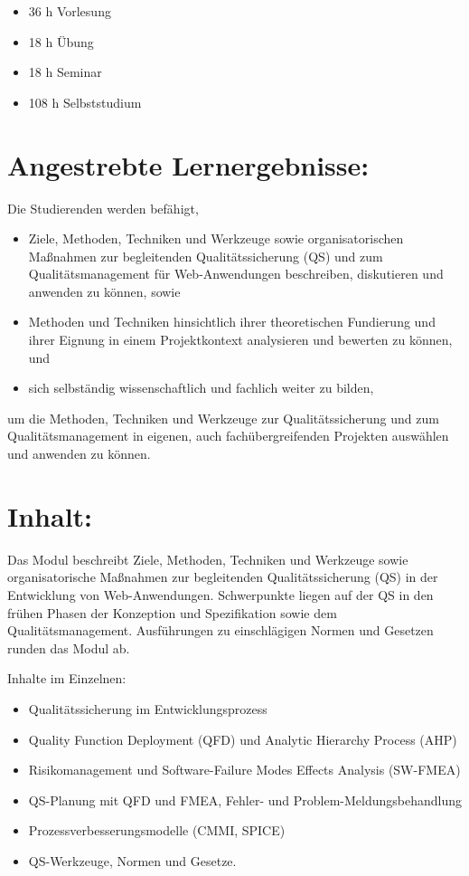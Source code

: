 \begin{itemize}
\tightlist
\item
  36 h Vorlesung
\item
  18 h Übung
\item
  18 h Seminar
\item
  108 h Selbststudium
\end{itemize}

\section*{Angestrebte
Lernergebnisse:}\label{angestrebte-lernergebnisse-21}

Die Studierenden werden befähigt,

\begin{itemize}
\tightlist
\item
  Ziele, Methoden, Techniken und Werkzeuge sowie organisatorischen
  Maßnahmen zur begleitenden Qualitätssicherung (QS) und zum
  Qualitätsmanagement für Web-Anwendungen beschreiben, diskutieren und
  anwenden zu können, sowie
\item
  Methoden und Techniken hinsichtlich ihrer theoretischen Fundierung und
  ihrer Eignung in einem Projektkontext analysieren und bewerten zu
  können, und
\item
  sich selbständig wissenschaftlich und fachlich weiter zu bilden,
\end{itemize}

um die Methoden, Techniken und Werkzeuge zur Qualitätssicherung und zum
Qualitätsmanagement in eigenen, auch fachübergreifenden Projekten
auswählen und anwenden zu können.

\section*{Inhalt:}\label{inhalt-21}

Das Modul beschreibt Ziele, Methoden, Techniken und Werkzeuge sowie
organisatorische Maßnahmen zur begleitenden Qualitätssicherung (QS) in
der Entwicklung von Web-Anwendungen. Schwerpunkte liegen auf der QS in
den frühen Phasen der Konzeption und Spezifikation sowie dem
Qualitätsmanagement. Ausführungen zu einschlägigen Normen und Gesetzen
runden das Modul ab.

Inhalte im Einzelnen:

\begin{itemize}
\tightlist
\item
  Qualitätssicherung im Entwicklungsprozess
\item
  Quality Function Deployment (QFD) und Analytic Hierarchy Process (AHP)
\item
  Risikomanagement und Software-Failure Modes Effects Analysis (SW-FMEA)
\item
  QS-Planung mit QFD und FMEA, Fehler- und Problem-Meldungsbehandlung
\item
  Prozessverbesserungsmodelle (CMMI, SPICE)
\item
  QS-Werkzeuge, Normen und Gesetze.
\end{itemize}

